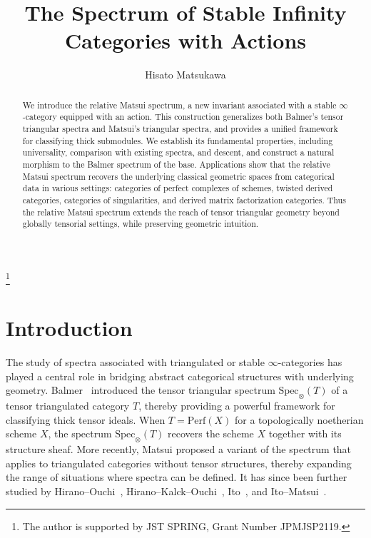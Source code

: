 \documentclass[11pt]{amsart}
\theoremstyle{definition}
\theoremstyle{plain}
\theoremstyle{remark}
\newcommand{\perf}{\mathrm{Perf}}
\newcommand{\oSpec}{\mathrm{Spec}_{\otimes}}
\numberwithin{equation}{section}
\begin{document}
\title{The Spectrum of Stable Infinity Categories with Actions}

\author{Hisato Matsukawa}
\address{Department of Mathematics, Faculty of Science, Hokkaido University, Kita 10, Nishi 8, Kita-Ku, Sapporo, Hokkaido, 060-0810, Japan}
\thanks{The author is supported by JST SPRING, Grant Number JPMJSP2119.}

\date{}

\dedicatory{}

\begin{abstract}
We introduce the relative Matsui spectrum, a new invariant associated with a stable \(\infty\)-category equipped with an action.  
This construction generalizes both Balmer's tensor triangular spectra and Matsui's triangular spectra, and provides a unified framework for classifying thick submodules.  
We establish its fundamental properties, including universality, comparison with existing spectra, and descent, and construct a natural morphism to the Balmer spectrum of the base.  
Applications show that the relative Matsui spectrum recovers the underlying classical geometric spaces from categorical data in various settings: categories of perfect complexes of schemes, twisted derived categories, categories of singularities, and derived matrix factorization categories.
Thus the relative Matsui spectrum extends the reach of tensor triangular geometry beyond globally tensorial settings, while preserving geometric intuition.
\end{abstract}

\maketitle
\tableofcontents

\section{Introduction}

The study of spectra associated with triangulated or stable \(\infty\)-categories has played a central role in bridging abstract categorical structures with underlying geometry.  
Balmer~\cite{Ba} introduced the tensor triangular spectrum \(\oSpec(T)\) of a tensor triangulated category \(T\), thereby providing a powerful framework for classifying thick tensor ideals.  
When \(T=\perf(X)\) for a topologically noetherian scheme \(X\), the spectrum \(\oSpec(T)\) recovers the scheme \(X\) together with its structure sheaf.  
More recently, Matsui proposed a variant of the spectrum that applies to triangulated categories without tensor structures, thereby expanding the range of situations where spectra can be defined.  
It has since been further studied by Hirano--Ouchi~\cite{HO, HO2}, Hirano--Kalck--Ouchi~\cite{HKO}, Ito~\cite{It}, and Ito--Matsui~\cite{IM}.
\end{document}
